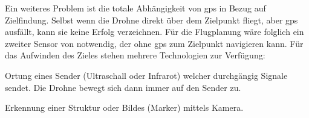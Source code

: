 Ein weiteres Problem ist die totale Abhängigkeit von \gls{gps} in Bezug auf Zielfindung. Selbst wenn die Drohne direkt über dem Zielpunkt fliegt, aber \gls{gps} ausfällt, kann sie keine Erfolg verzeichnen. Für die Flugplanung wäre folglich ein zweiter Sensor von notwendig, der ohne \gls{gps} zum Zielpunkt navigieren kann. Für das Aufwinden des Zieles stehen mehrere Technologien zur Verfügung:
\begin{compactdesc}
    \item[Ortung] eines Sender (Ultraschall oder Infrarot) welcher durchgängig Signale sendet. Die Drohne bewegt sich dann immer auf den Sender zu.
    \item[Erkennung] einer Struktur oder Bildes (Marker) mittels Kamera.
\end{compactdesc}
%
%
%

